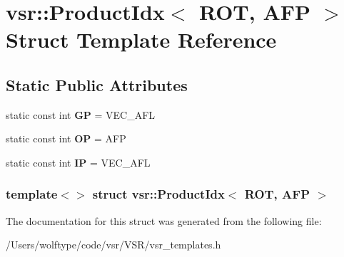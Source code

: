 \hypertarget{structvsr_1_1_product_idx_3_01_r_o_t_00_01_a_f_p_01_4}{\section{vsr\-:\-:Product\-Idx$<$ R\-O\-T, A\-F\-P $>$ Struct Template Reference}
\label{structvsr_1_1_product_idx_3_01_r_o_t_00_01_a_f_p_01_4}
}
\subsection*{Static Public Attributes}
\begin{DoxyCompactItemize}
\item 
\hypertarget{structvsr_1_1_product_idx_3_01_r_o_t_00_01_a_f_p_01_4_a2b23047bcfccfd22d6f67f678457608f}{static const int {\bfseries G\-P} = V\-E\-C\-\_\-\-A\-F\-L}\label{structvsr_1_1_product_idx_3_01_r_o_t_00_01_a_f_p_01_4_a2b23047bcfccfd22d6f67f678457608f}

\item 
\hypertarget{structvsr_1_1_product_idx_3_01_r_o_t_00_01_a_f_p_01_4_afd189d9866fe10866c41e6f933cab5f0}{static const int {\bfseries O\-P} = A\-F\-P}\label{structvsr_1_1_product_idx_3_01_r_o_t_00_01_a_f_p_01_4_afd189d9866fe10866c41e6f933cab5f0}

\item 
\hypertarget{structvsr_1_1_product_idx_3_01_r_o_t_00_01_a_f_p_01_4_a78a69873e33ed98396f7aa02f4c5fb99}{static const int {\bfseries I\-P} = V\-E\-C\-\_\-\-A\-F\-L}\label{structvsr_1_1_product_idx_3_01_r_o_t_00_01_a_f_p_01_4_a78a69873e33ed98396f7aa02f4c5fb99}

\end{DoxyCompactItemize}
\subsubsection*{template$<$$>$ struct vsr\-::\-Product\-Idx$<$ R\-O\-T, A\-F\-P $>$}



The documentation for this struct was generated from the following file\-:\begin{DoxyCompactItemize}
\item 
/\-Users/wolftype/code/vsr/\-V\-S\-R/vsr\-\_\-templates.\-h\end{DoxyCompactItemize}
